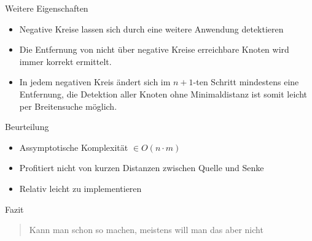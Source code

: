 \begin{frame}{Weitere Eigenschaften}
\begin{itemize}
	\item Negative Kreise lassen sich durch eine weitere Anwendung detektieren
	\item Die Entfernung von nicht über negative Kreise erreichbare Knoten wird immer korrekt ermittelt.
	\item In jedem negativen Kreis ändert sich im $n + 1$-ten Schritt mindestens eine Entfernung,
		die Detektion aller Knoten ohne Minimaldistanz ist somit leicht per Breitensuche möglich.
\end{itemize}
\end{frame}

\begin{frame}{Beurteilung}
\begin{itemize}
\itemsep1pt\parskip0pt
\item
  Assymptotische Komplexität $\in O(n \cdot m)$
\item
  Profitiert nicht von kurzen Distanzen zwischen Quelle und Senke
\item
  Relativ leicht zu implementieren
\end{itemize}

\end{frame}

\begin{frame}{Fazit}

\begin{quote}
Kann man schon so machen, meistens will man das aber nicht
\end{quote}

\end{frame}
